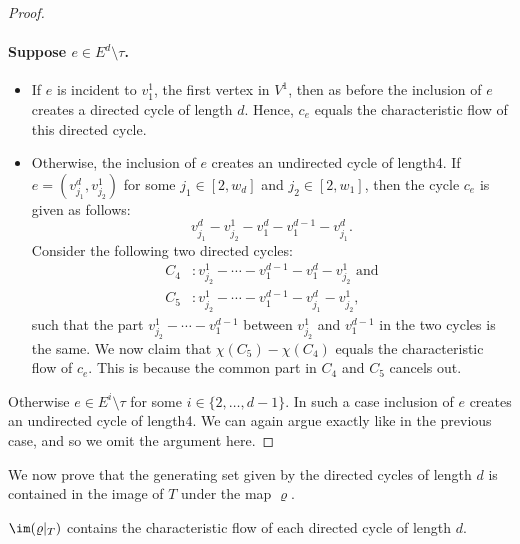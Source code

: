 \begin{proof}
\paragraph{Suppose $e\in E^d\setminus\tau$.}
\begin{itemize}
\item If $e$ is incident to $v^1_1$, the first vertex in $V^1$, then as before the inclusion of $e$ creates a directed cycle of length $d$. Hence, $c_e$ equals the characteristic flow of this directed cycle.
\item Otherwise, the inclusion of $e$ creates an undirected cycle of length4. If $e=(v^d_{j_1},v^1_{j_2})$ for some $j_1\in[2,w_d]$ and $j_2\in[2,w_1]$, then the cycle $c_e$ is given as follows:
\[v^d_{j_1}-v^1_{j_2}-v^d_1-v^{d-1}_1-v^d_{j_1}.\]
Consider the following two directed cycles:
\begin{align*}C_4&:v^1_{j_2}-\cdots-v^{d-1}_1-v^d_1-v^1_{j_2}\text{ and}\\C_5&:v^1_{j_2}-\cdots-v^{d-1}_1-v^d_{j_1}-v^1_{j_2},\end{align*}
such that the part $v^1_{j_2}-\cdots-v^{d-1}_1$ between $v^1_{j_2}$ and $v^{d-1}_1$ in the two cycles is the same. We now claim that $\chi(C_5)-\chi(C_4)$ equals the characteristic flow of $c_e$. This is because the common part in $C_4$ and $C_5$ cancels out.
\end{itemize}
Otherwise $e\in E^i\setminus\tau$ for some $i\in\{2,\ldots,d-1\}$. In such a case inclusion of $e$ creates an undirected cycle of length4. We can again argue exactly like in the previous case, and so we omit the argument here.
\end{proof}
We now prove that the generating set given by the directed cycles of length $d$ is contained in the image of $T$ under the map $\varrho$.
\begin{claim}$\im(\varrho|_T)$ contains the characteristic flow of each directed cycle of length $d$.\end{claim}
